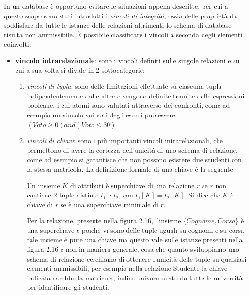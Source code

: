 \documentclass[a4paper,12pt, oneside]{book}
\begin{document}
In un database è opportuno evitare le situazioni appena descritte, per cui a questo scopo sono stati
introdotti i \emph{vincoli di integrità}, ossia delle proprietà da soddisfare da tutte le istanze delle
relazioni altrimenti lo schema di database risulta non ammissibile.\newline
È possibile classificare i vincoli a seconda degli elementi coinvolti:
\begin{itemize}
    \item \textbf{vincolo intrarelazionale}: sono i vincoli definiti sulle singole relazioni e su cui a sua
        volta si divide in 2 sottocategorie:
        \begin{enumerate}
            \item \emph{vincoli di tupla}: sono delle limitazioni effettuate su ciascuna tupla
                indipendentemente dalle altre e vengono definite tramite delle espressioni booleane, i cui
                atomi sono valutati attraverso dei confronti, come ad esempio un vincolo sui voti degli esami
                può essere $(Voto \geq 0) and (Voto \leq 30)$.
            \item \emph{vincoli di chiavi}: sono i più importanti vincoli intrarelazionali, che permettono di
                avere la certezza dell'unicità di uno schema di relazione, come ad esempio si garantisce che
                non possono esistere due studenti con la stessa matricola.\newline
                La definizione formale di una chiave è la seguente:
                \begin{definizione}
                    Un insieme $K$ di attributi è superchiave di una relazione $r$ se $r$ non contiene 2 tuple
                    distinte $t_1$ e $t_2$, con $t_1[K] = t_2[K]$.\newline
                    Si dice che $K$ è chiave di $r$ se è una superchiave minimale di $r$.
                \end{definizione}
                Per la relazione, presente nella figura 2.16, l'insieme $\{Cognome, Corso\}$ è una superchiave
                e poiche vi sono delle tuple uguali su cognomi e su corsi, tale insieme è pure una chiave ma
                questo vale sulle istanze presenti nella figura 2.16 e non in maniera generale, cosa che
                quanto sviluppiamo uno schema di relazione cerchiamo di ottenere l'unicità delle tuple su
                qualsiasi elementi ammissibili, per esempio nella relazione Studente la chiave indicata
                sarebbe la matricola, indice univoco usato da tutte le università per identificare gli studenti.


\end{enumerate}
\end{itemize}
\end{document}
